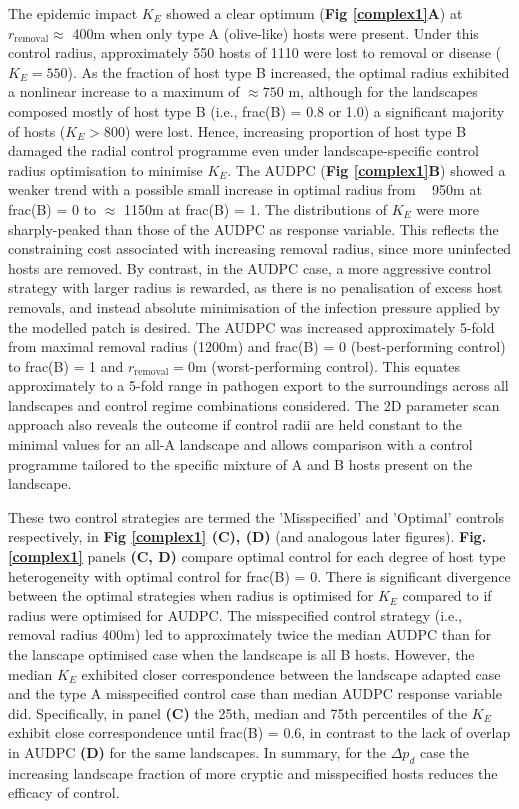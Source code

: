 \documentclass[11pt,letterpaper]{article}
\begin{document}
The epidemic impact $K_E$ showed a clear optimum (\textbf{Fig \ref{complex1}A}) at $r_{\mathrm{removal}} \approx$ 400m when only type A (olive-like) hosts were present. Under this control radius, approximately 550 hosts of 1110 were lost to removal or disease ($K_E = 550$). As the fraction of host type B increased, the optimal radius exhibited a nonlinear increase to a maximum of $\approx 750$ m, although for the landscapes composed mostly of host type B (i.e., frac(B) = 0.8 or 1.0) a significant majority of hosts ($K_E > 800$) were lost. Hence, increasing proportion of host type B damaged the radial control programme even under landscape-specific control radius optimisation to minimise $K_E$.  The AUDPC (\textbf{Fig \ref{complex1}B}) showed a weaker trend with a possible small increase in optimal radius from ~ 950m at frac(B) = 0 to $\approx$ 1150m at frac(B) = 1. The distributions of $K_E$ were more sharply-peaked than those of the AUDPC as response variable. This reflects the constraining cost associated with increasing removal radius, since more uninfected hosts are removed. By contrast, in the AUDPC case, a more aggressive control strategy with larger radius is rewarded, as there is no penalisation of excess host removals, and instead absolute minimisation of the infection pressure applied by the modelled patch is desired. The AUDPC was increased approximately 5-fold from maximal removal radius (1200m) and frac(B) = 0 (best-performing control) to frac(B) = 1 and $r_\mathrm{removal} = 0$m (worst-performing control). This equates approximately to a 5-fold range in pathogen export to the surroundings across all landscapes and control regime combinations considered. The 2D parameter scan approach also reveals the outcome if control radii are held constant to the minimal values for an all-A landscape and allows comparison with a control programme tailored to the specific mixture of A and B hosts present on the landscape. 


These two control strategies are termed the 'Misspecified' and 'Optimal' controls respectively, in \textbf{Fig \ref{complex1} (C), (D)} (and analogous later figures). \textbf{Fig. \ref{complex1}} panels \textbf{(C, D)} compare optimal control for each degree of host type heterogeneity with optimal control for frac(B) = 0. There is significant divergence between the optimal strategies when radius is optimised for $K_E$ compared to if radius were optimised for AUDPC. The misspecified control strategy (i.e., removal radius 400m) led to approximately twice the median AUDPC than for the lanscape optimised case when the landscape is all B hosts. However, the median $K_E$ exhibited closer correspondence between the landscape adapted case and the type A misspecified control case than median AUDPC response variable did. Specifically, in panel \textbf{(C)} the 25th, median and 75th percentiles of the $K_E$ exhibit close correspondence until frac(B) = 0.6, in contrast to the lack of overlap in AUDPC \textbf{(D)} for the same landscapes. In summary, for the $\Delta p_d$ case the increasing landscape fraction of more cryptic and misspecified hosts reduces the efficacy of control. 
\end{document}
